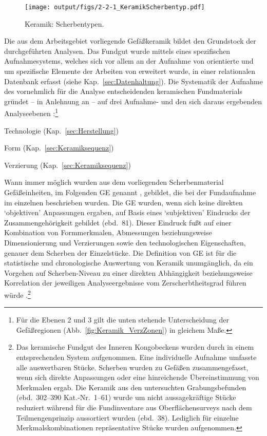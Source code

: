 \begin{figure*}[!tb]
\centering
\texttt{[image: output/figs/2-2-1\_KeramikScherbentyp.pdf]}
\caption{Keramik: Scherbentypen.}
\label{KeramikScherbentypen}
\end{figure*}

Die aus dem Arbeitsgebiet vorliegende Gefäßkeramik bildet den Grundstock der durchgeführten Analysen. Das Fundgut wurde mittels eines spezifischen Aufnahmesystems, welches sich vor allem an der Aufnahme von \textcite{Wotzka.1995} orientierte und um spezifische Elemente der Arbeiten von \textcites{Nordstrom.1972}{Stehli.1973}{Keding.1997}{Jesse.2003}{Clist.20042005} erweitert wurde, in einer relationalen Datenbank erfasst (siehe Kap.~\ref{sec:Datenhaltung}). Die Systematik der Aufnahme des vornehmlich für die Analyse entscheidenden keramischen Fundmaterials gründet -- in Anlehnung an \textcite[57ff.]{Stehli.1973} -- auf drei Aufnahme- und den sich daraus ergebenden Analyseebenen \parencite[siehe][36]{Keding.1997}:\footnote{Für die Ebenen 2 und 3 gilt die unten stehende Unterscheidung der Gefäßregionen (Abb.~\ref{fig:Keramik_VerzZonen}) in gleichem Maße.}
\begin{enumerate*}
	\item Technologie (Kap.~\ref{sec:Herstellung})
	\item Form (Kap.~\ref{sec:Keramiksequenz})
	\item Verzierung (Kap.~\ref{sec:Keramiksequenz})
\end{enumerate*}

\noindent Wann immer möglich wurden aus dem vorliegenden Scherbenmaterial Gefäßeinheiten, im Folgenden GE genannt \parencite[siehe][]{Jesse.2003}, gebildet, die bei der Fundaufnahme im einzelnen beschrieben wurden. Die GE wurden, wenn sich keine direkten \enquote*{objektiven} Anpassungen ergaben, auf Basis eines \enquote*{subjektiven} Eindrucks der Zusammengehörigkeit gebildet (ebd.~81). Dieser Eindruck fußt auf einer Kombination von Formmerkmalen, Abmessungen beziehungsweise Dimensionierung und Verzierungen sowie den technologischen Eigenschaften, genauer dem Scherben der Einzelstücke. Die Definition von GE ist für die statistische und chronologische Auswertung von Keramik unumgänglich, da ein Vorgehen auf Scherben-Niveau zu einer direkten Abhängigkeit beziehungsweise Korrelation der jeweiligen Analyseergebnisse vom Zerscherbtheitsgrad führen würde \parencites[siehe][36f.]{Keding.1997}[nach][483]{Drew.1988}.\footnote{Das keramische Fundgut des Inneren Kongobeckens wurden durch \textcite[38]{Wotzka.1995} in einem entsprechenden System aufgenommen. Eine individuelle Aufnahme umfasste alle auswertbaren Stücke. Scherben wurden zu Gefäßen zusammengefasst, wenn sich direkte Anpassungen oder eine hinreichende Übereinstimmung von Merkmalen ergab. Die Keramik aus den untersuchten Grabungsbefunden (ebd.~302--390 Kat.-Nr.~1--61) wurde um nicht aussagekräftige Stücke reduziert während für die Fundinventare aus Oberflächensurveys nach dem Teilmengenprinzip aussortiert wurden (ebd.~38). Lediglich für einzelne Merkmalskombinationen repräsentative Stücke wurden aufgenommen.}

